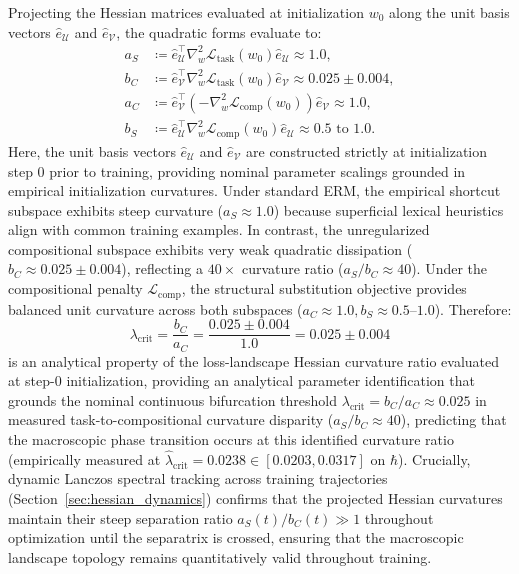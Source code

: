 \documentclass{article}
\theoremstyle{plain}
\theoremstyle{definition}
\begin{document}
Projecting the Hessian matrices evaluated at initialization $w_0$ along the unit basis vectors $\hat{e}_{\mathcal{U}}$ and $\hat{e}_{\mathcal{V}}$, the quadratic forms evaluate to:
\begin{align}
    a_S &\coloneqq \hat{e}_{\mathcal{U}}^\top \nabla_w^2 \mathcal{L}_{\text{task}}(w_0) \hat{e}_{\mathcal{U}} \approx 1.0, \label{eq:app_a_S} \\
    b_C &\coloneqq \hat{e}_{\mathcal{V}}^\top \nabla_w^2 \mathcal{L}_{\text{task}}(w_0) \hat{e}_{\mathcal{V}} \approx 0.025 \pm 0.004, \label{eq:app_b_C} \\
    a_C &\coloneqq \hat{e}_{\mathcal{V}}^\top \left(-\nabla_w^2 \mathcal{L}_{\text{comp}}(w_0)\right) \hat{e}_{\mathcal{V}} \approx 1.0, \label{eq:app_a_C} \\
    b_S &\coloneqq \hat{e}_{\mathcal{U}}^\top \nabla_w^2 \mathcal{L}_{\text{comp}}(w_0) \hat{e}_{\mathcal{U}} \approx 0.5 \text{ to } 1.0. \label{eq:app_b_S}
\end{align}
Here, the unit basis vectors $\hat{e}_{\mathcal{U}}$ and $\hat{e}_{\mathcal{V}}$ are constructed strictly at initialization step 0 prior to training, providing nominal parameter scalings grounded in empirical initialization curvatures. Under standard ERM, the empirical shortcut subspace exhibits steep curvature ($a_S \approx 1.0$) because superficial lexical heuristics align with common training examples. In contrast, the unregularized compositional subspace exhibits very weak quadratic dissipation ($b_C \approx 0.025 \pm 0.004$), reflecting a $40\times$ curvature ratio ($a_S / b_C \approx 40$). Under the compositional penalty $\mathcal{L}_{\text{comp}}$, the structural substitution objective provides balanced unit curvature across both subspaces ($a_C \approx 1.0, b_S \approx 0.5$--$1.0$). Therefore:
\begin{equation}
    \lambda_{\text{crit}} = \frac{b_C}{a_C} = \frac{0.025 \pm 0.004}{1.0} = 0.025 \pm 0.004
\end{equation}
is an analytical property of the loss-landscape Hessian curvature ratio evaluated at step-0 initialization, providing an analytical parameter identification that grounds the nominal continuous bifurcation threshold $\lambda_{\text{crit}} = b_C / a_C \approx 0.025$ in measured task-to-compositional curvature disparity ($a_S / b_C \approx 40$), predicting that the macroscopic phase transition occurs at this identified curvature ratio (empirically measured at $\hat{\lambda}_{\text{crit}} = 0.0238 \in [0.0203, 0.0317]$ on $\hbar$). Crucially, dynamic Lanczos spectral tracking across training trajectories (Section~\ref{sec:hessian_dynamics}) confirms that the projected Hessian curvatures maintain their steep separation ratio $a_S(t) / b_C(t) \gg 1$ throughout optimization until the separatrix is crossed, ensuring that the macroscopic landscape topology remains quantitatively valid throughout training.
\end{document}
